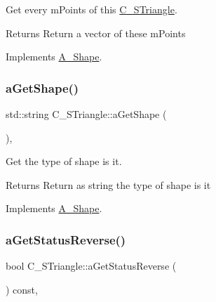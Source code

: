 Get every m\+Points of this \hyperlink{classC__STriangle}{C\+\_\+\+S\+Triangle}. 

\begin{DoxyReturn}{Returns}
Return a vector of these m\+Points 
\end{DoxyReturn}


Implements \hyperlink{classA__Shape_a9fd1285bd63b1fc88943c9969bf01a5c}{A\+\_\+\+Shape}.

\mbox{\label{classC__STriangle_a40c1434870b99112c4457819c9295483}} 
\subsubsection{\texorpdfstring{a\+Get\+Shape()}{aGetShape()}}
{\footnotesize\ttfamily std\+::string C\+\_\+\+S\+Triangle\+::a\+Get\+Shape (\begin{DoxyParamCaption}{ }\end{DoxyParamCaption})\hspace{0.3cm}{\ttfamily [override]}, {\ttfamily [virtual]}}



Get the type of shape is it. 

\begin{DoxyReturn}{Returns}
Return as string the type of shape is it 
\end{DoxyReturn}


Implements \hyperlink{classA__Shape_a1b202256a4e5dcb0edab4ab93a37122c}{A\+\_\+\+Shape}.

\mbox{\label{classC__STriangle_a707d24ede0b9db731dbefee9ab5c017b}} 
\subsubsection{\texorpdfstring{a\+Get\+Status\+Reverse()}{aGetStatusReverse()}}
{\footnotesize\ttfamily bool C\+\_\+\+S\+Triangle\+::a\+Get\+Status\+Reverse (\begin{DoxyParamCaption}{ }\end{DoxyParamCaption}) const\hspace{0.3cm}{\ttfamily [override]}, {\ttfamily [virtual]}}




